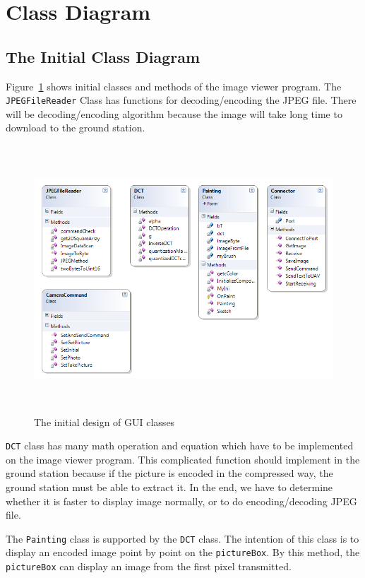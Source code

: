 \section{Class Diagram}
\subsection*{The Initial Class Diagram}
Figure~\ref{ini_Class} shows initial classes and methods of the image viewer program.
The \texttt{JPEGFileReader} Class has functions for decoding/encoding the JPEG file.
There will be decoding/encoding algorithm because the image will take long time to download to the ground station. 
\begin{center}
\begin{figure}[!hbtp]
\includegraphics[width=150mm,height=100mm]{figures/initialClassDiagram.png} 
\caption{The initial design of GUI classes\label{ini_Class}}
\end{figure}
\end{center}
\texttt{DCT} class has many math operation and equation which have to be implemented on the image viewer program. 
This complicated function should implement in the ground station because if the picture is encoded in the compressed way, the ground station must be able to extract it. 
In the end, we have to determine whether it is faster to display image normally, or to do encoding/decoding JPEG file. 

The \texttt{Painting} class is supported by the \texttt{DCT} class. The intention of this class is to display an encoded image point by point on the \texttt{pictureBox}.
By this method, the \texttt{pictureBox} can display an image from the first pixel transmitted.

